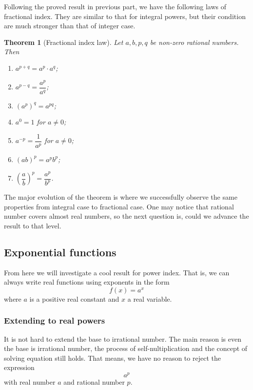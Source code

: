 \documentclass[12pt]{article}
\newtheorem*{theorem}{Theorem}
\begin{document}
    Following the proved result in previous part, we have the following laws of fractional index. They are similar to that for integral powers, but their condition are much stronger than that of integer case.

    \begin{theorem}[Fractional index law]
        Let $a,b,p,q$ be non-zero rational numbers. Then\begin{enumerate}
            \item $a^{p+q}=a^p\cdot a^q$;
            \item $a^{p-q}=\dfrac{a^p}{a^q}$;
            \item $(a^p)^q=a^{pq}$;
            \item $a^0=1$ for $a\neq 0$;
            \item $a^{-p}=\dfrac{1}{a^p}$ for $a\neq 0$;
            \item $(ab)^p=a^p b^p$;
            \item $(\dfrac{a}{b})^p=\dfrac{a^p}{b^p}$.
        \end{enumerate}
    \end{theorem}

    The major evolution of the theorem is where we successfully observe the same properties from integral case to fractional case. One may notice that rational number covers almost real numbers, so the next question is, could we advance the result to that level.

    \subsection{Exponential functions}

    From here we will investigate a cool result for power index. That is, we can always write real functions using exponents in the form $$f(x)=a^x$$ where $a$ is a positive real constant and $x$ a real variable.

    \subsubsection*{Extending to real powers}

    It is not hard to extend the base to irrational number. The main reason is even the base is irrational number, the process of self-nultiplication and the concept of solving equation still holds. That means, we have no reason to reject the expression $$a^p$$ with real number $a$ and rational number $p$.
    
\end{document}
